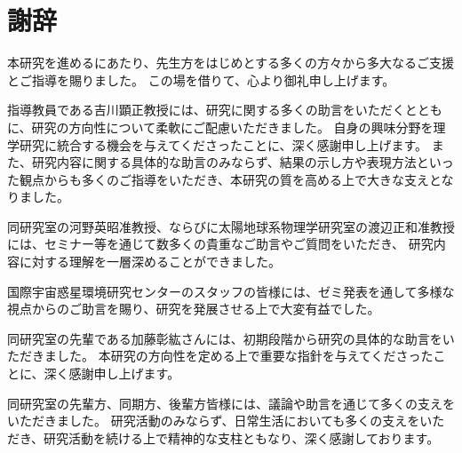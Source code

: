 \section*{謝辞}

本研究を進めるにあたり、先生方をはじめとする多くの方々から多大なるご支援とご指導を賜りました。
この場を借りて、心より御礼申し上げます。

指導教員である吉川顕正教授には、研究に関する多くの助言をいただくとともに、研究の方向性について柔軟にご配慮いただきました。
自身の興味分野を理学研究に統合する機会を与えてくださったことに、深く感謝申し上げます。
また、研究内容に関する具体的な助言のみならず、結果の示し方や表現方法といった観点からも多くのご指導をいただき、本研究の質を高める上で大きな支えとなりました。

同研究室の河野英昭准教授、ならびに太陽地球系物理学研究室の渡辺正和准教授には、セミナー等を通じて数多くの貴重なご助言やご質問をいただき、
研究内容に対する理解を一層深めることができました。

国際宇宙惑星環境研究センターのスタッフの皆様には、ゼミ発表を通して多様な視点からのご助言を賜り、研究を発展させる上で大変有益でした。

同研究室の先輩である加藤彰紘さんには、初期段階から研究の具体的な助言をいただきました。
本研究の方向性を定める上で重要な指針を与えてくださったことに、深く感謝申し上げます。

同研究室の先輩方、同期方、後輩方皆様には、議論や助言を通じて多くの支えをいただきました。
研究活動のみならず、日常生活においても多くの支えをいただき、研究活動を続ける上で精神的な支柱ともなり、深く感謝しております。